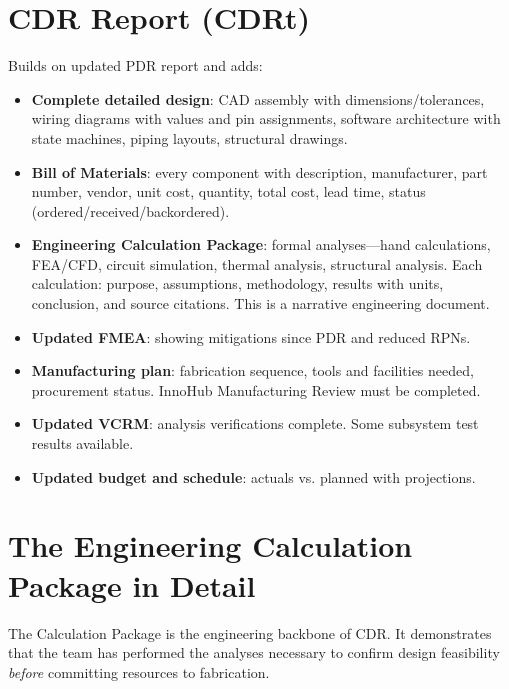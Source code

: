 \section{CDR Report (CDRt)}
Builds on updated PDR report and adds:
\begin{itemize}[nosep,leftmargin=1.5em]
\item \textbf{Complete detailed design}: CAD assembly with dimensions/tolerances, wiring diagrams with values and pin assignments, software architecture with state machines, piping layouts, structural drawings.
\item \textbf{Bill of Materials}: every component with description, manufacturer, part number, vendor, unit cost, quantity, total cost, lead time, status (ordered/received/backordered).
\item \textbf{Engineering Calculation Package}: formal analyses---hand calculations, FEA/CFD, circuit simulation, thermal analysis, structural analysis. Each calculation: purpose, assumptions, methodology, results with units, conclusion, and source citations. This is a narrative engineering document.
\item \textbf{Updated FMEA}: showing mitigations since PDR and reduced RPNs.
\item \textbf{Manufacturing plan}: fabrication sequence, tools and facilities needed, procurement status. InnoHub Manufacturing Review must be completed.
\item \textbf{Updated VCRM}: analysis verifications complete. Some subsystem test results available.
\item \textbf{Updated budget and schedule}: actuals vs. planned with projections.
\end{itemize}

\section{The Engineering Calculation Package in Detail}
The Calculation Package is the engineering backbone of CDR. It demonstrates that the team has performed the analyses necessary to confirm design feasibility \emph{before} committing resources to fabrication.

